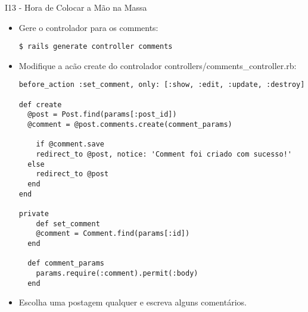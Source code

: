 \begin{frame}{I13 - Hora de Colocar a Mão na Massa}
\begin{itemize}
\item Gere o controlador para os comments:
		\begin{lstlisting}[style=BashInputBasicStyle]
			$ rails generate controller comments
		\end{lstlisting}
		
\item Modifique a acão create do controlador \alert{controllers/comments\_controller.rb}:
\begin{lstlisting}[style=RubyInputStyle]
before_action :set_comment, only: [:show, :edit, :update, :destroy]

def create
  @post = Post.find(params[:post_id])
  @comment = @post.comments.create(comment_params)

	if @comment.save
  	redirect_to @post, notice: 'Comment foi criado com sucesso!' 
  else
    redirect_to @post
  end
end 

private
	def set_comment
  	@comment = Comment.find(params[:id])
  end

  def comment_params
    params.require(:comment).permit(:body)
  end
\end{lstlisting}

\item Escolha uma postagem qualquer e escreva alguns comentários.

	\end{itemize}
\end{frame}